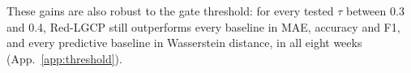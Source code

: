 These gains are also robust to the gate threshold: for every tested $\tau$ between 0.3 and 0.4, Red-LGCP still outperforms every baseline in MAE, accuracy and F1, and every predictive baseline in Wasserstein distance, in all eight weeks (App.~\ref{app:threshold}).
